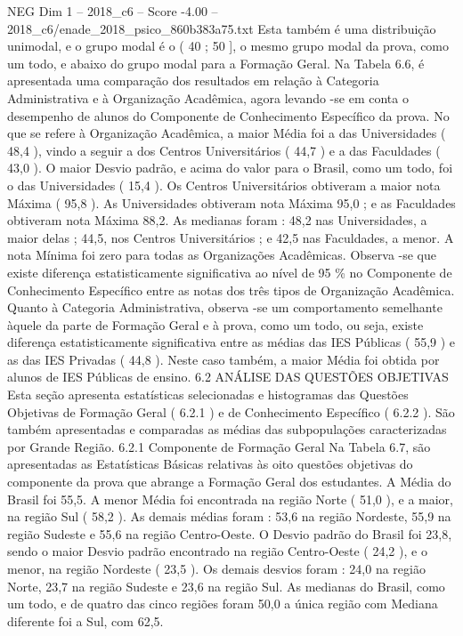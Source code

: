 \begin{textsample}{NEG Dim 1 – 2018\_c6 – Score -4.00 – 2018\_c6/enade\_2018\_psico\_860b383a75.txt}
Esta também é uma distribuição unimodal, e o grupo modal é o ( 40 ; 50 ], o mesmo grupo modal da prova, como um todo, e abaixo do grupo modal para a Formação Geral.
Na Tabela 6.6, é apresentada uma comparação dos resultados em relação à Categoria Administrativa e à Organização Acadêmica, agora levando -se em conta o desempenho de alunos do Componente de Conhecimento Específico da prova.
No que se refere à Organização Acadêmica, a maior Média foi a das Universidades ( 48,4 ), vindo a seguir a dos Centros Universitários ( 44,7 ) e a das Faculdades ( 43,0 ).
O maior Desvio padrão, e acima do valor para o Brasil, como um todo, foi o das Universidades ( 15,4 ).
Os Centros Universitários obtiveram a maior nota Máxima ( 95,8 ).
As Universidades obtiveram nota Máxima 95,0 ; e as Faculdades obtiveram nota Máxima 88,2.
As medianas foram : 48,2 nas Universidades, a maior delas ; 44,5, nos Centros Universitários ; e 42,5 nas Faculdades, a menor.
A nota Mínima foi zero para todas as Organizações Acadêmicas.
Observa -se que existe diferença estatisticamente significativa ao nível de 95 \% no Componente de Conhecimento Específico entre as notas dos três tipos de Organização Acadêmica.
Quanto à Categoria Administrativa, observa -se um comportamento semelhante àquele da parte de Formação Geral e à prova, como um todo, ou seja, existe diferença estatisticamente significativa entre as médias das IES Públicas ( 55,9 ) e as das IES Privadas ( 44,8 ).
Neste caso também, a maior Média foi obtida por alunos de IES Públicas de ensino. 6.2 ANÁLISE DAS QUESTÕES OBJETIVAS Esta seção apresenta estatísticas selecionadas e histogramas das Questões Objetivas de Formação Geral ( 6.2.1 ) e de Conhecimento Específico ( 6.2.2 ).
São também apresentadas e comparadas as médias das subpopulações caracterizadas por Grande Região. 6.2.1 Componente de Formação Geral Na Tabela 6.7, são apresentadas as Estatísticas Básicas relativas às oito questões objetivas do componente da prova que abrange a Formação Geral dos estudantes.
A Média do Brasil foi 55,5.
A menor Média foi encontrada na região Norte ( 51,0 ), e a maior, na região Sul ( 58,2 ).
As demais médias foram : 53,6 na região Nordeste, 55,9 na região Sudeste e 55,6 na região Centro-Oeste.
O Desvio padrão do Brasil foi 23,8, sendo o maior Desvio padrão encontrado na região Centro-Oeste ( 24,2 ), e o menor, na região Nordeste ( 23,5 ).
Os demais desvios foram : 24,0 na região Norte, 23,7 na região Sudeste e 23,6 na região Sul.
As medianas do Brasil, como um todo, e de quatro das cinco regiões foram 50,0 a única região com Mediana diferente foi a Sul, com 62,5.

\end{textsample}
